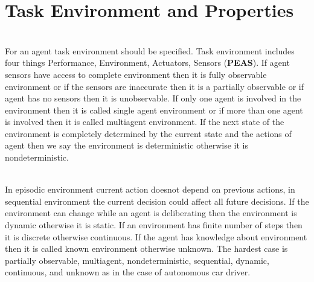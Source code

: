 \documentclass{article}
\begin{document}
\section{Task Environment and Properties}
\begin{paragraph}
\\
For an agent task environment should be specified. Task environment includes four things Performance, Environment, Actuators, Sensors (\textbf{PEAS}). If agent sensors have access to complete environment then it is fully observable environment or if the sensors are inaccurate then it is a partially observable or if agent has no sensors then it is unobservable. If only one agent is involved in the environment then it is called single agent environment or if more than one agent is involved then it is called multiagent environment. If the next state of the environment is completely determined by the current state and the actions of agent then we say the environment is deterministic otherwise it is nondeterministic.
\end{paragraph}
\begin{paragraph}
\\
In episodic environment current action doesnot depend on previous actions, in sequential environment the current decision could affect all future decisions. If the environment can change while an agent is deliberating then the environment is dynamic otherwise it is static. If an environment has finite number of steps then it is discrete otherwise continuous. If the agent has knowledge about environment then it is called known environment otherwise unknown. The hardest case is partially observable, multiagent, nondeterministic, sequential, dynamic, continuous, and unknown as in the case of autonomous car driver.
\end{paragraph}
\end{document}
